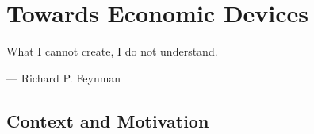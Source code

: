 \chapter{Towards Economic Devices}
\label{sec:economicobjects}

\epigraph{What I cannot create, I do not understand.}{--- \textup{Richard P. Feynman}}


\section{Context and Motivation}











